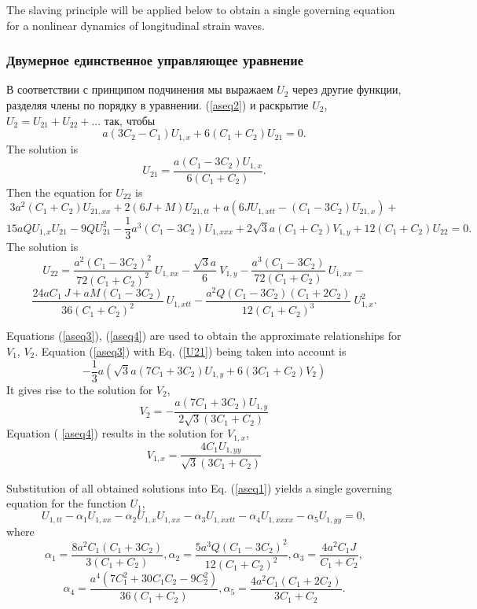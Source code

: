 The slaving principle \cite{porpas04} will be applied below to obtain a single governing equation for a nonlinear dynamics of longitudinal strain waves.

\subsubsection{Двумерное единственное управляющее уравнение}


В соответствии с принципом подчинения \cite {porpas04} мы выражаем $ U_2 $ через другие функции, разделяя члены по порядку в уравнении. (\ref {aseq2}) и раскрытие $ U_2 $, ~ $ U_2 = U_{21} + U_{22} + ... $ так, чтобы
\[
a (3 C_2- C_1) U_{1,x}+6 ( C_1+C_2) U_{21}=0.
\]
The solution is
\begin{equation}
	U_{21}=\frac{a (C_1-3 C_2) U_{1,x}}{6 (C_1+C_2)}.\label{U21}
\end{equation}
Then the equation for $U_{22}$ is
\[
3 a^2 (C_1+C_2) U_{21,xx}+2 (6 J+M) U_{21,tt}+ a \left(6 J U_{1,xtt}- (C_1-3 C_2) U_{21,x}\right)+
\]
\[
15 a Q U_{1,x} U_{21}-9 Q U_{21}^2-\frac{1}{3} a^3 (C_1-3 C_2) U_{1,xxx}+2 \sqrt{3} a (C_1+C_2) V_{1,y}+12 (C_1+C_2) U_{22}=0.
\]
The solution is
\[
U_{22}=\frac{a^2 (C_1-3C_2)^2}{72(C_1+C_2)^2}~ U_{1,xx}-\frac{\sqrt{3} a}{6}~V_{1,y}-\frac{a^3(C_1-3C_2)}{72(C_1+C_2)}~ U_{1,xx}-
\]
\[
\frac{24 a C_1~J+a M (C_1-3C_2)}{36(C_1+C_2)^2}~ U_{1,xtt}-\frac{a^2 Q (C_1-3C_2)(C_1+2C_2)}{12(C_1+C_2)^3}~ U_{1,x}^2.
\]

Equations (\ref{aseq3}), (\ref{aseq4}) are used to obtain the approximate relationships for $V_1$, $V_2$.
Equation (\ref{aseq3}) with Eq. (\ref{U21}) being taken into account is
\[
-\frac{1}{3} a \left(\sqrt{3} a (7 C_1+3 C_2) U_{1,y}+6 (3 C_1+C_2) V_2  \right)
\] 
It gives rise to the solution for $V_2$,
\[
V_2= -\frac{a (7 C_1+3 C_2) U_{1,y}}{2 \sqrt{3} (3 C_1+C_2)}
\]
Equation ( \ref{aseq4}) results in the solution for $V_{1,x}$,
\[
V_{1,x}=\frac{4 C_1 U_{1,yy}}{\sqrt{3} (3 C_1+C_2)}
\]


Substitution of all obtained solutions into Eq. (\ref{aseq1}) yields a single governing equation for the function $U_1$,
\begin{equation}
	U_{1,tt}-\alpha_1 U_{1,xx}-\alpha_2 U_{1,x}  U_{1,xx}-\alpha_3 U_{1,xxtt}-\alpha_4 U_{1,xxxx}-\alpha_5 U_{1,yy}=0, \label{sineq}
\end{equation}
where
\[
\alpha_1=\frac{8 a^2 C_1 (C_1+3 C_2)}{3 (C_1+C_2)}, \alpha_2=\frac{5 a^3 Q (C_1-3C_2)^2}{12 (C_1+C_2)^2}, \alpha_3=\frac{4 a^2 C_1 J}{C_1+C_2} , 
\]
\[
\alpha_4=\frac{a^4 \left(7 C_1^2+30 C_1 C_2-9 C_2^2\right)}{36 (C_1+C_2)}, \alpha_5=\frac{4 a^2 C_1 (C_1+2 C_2)}{3C_1+C_2}.
\]

